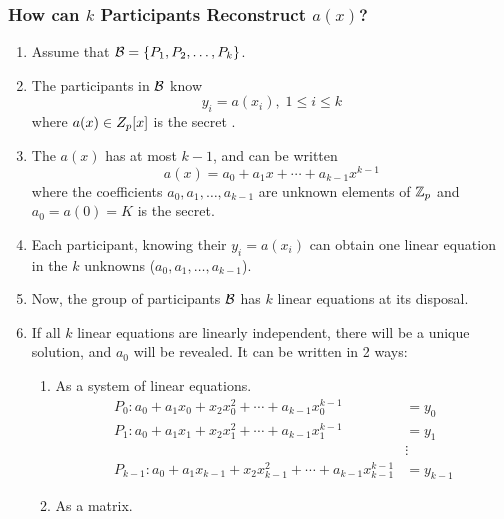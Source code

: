\subsubsection{\texorpdfstring{How can $k$ Participants Reconstruct $a(x)$?}{Successfully Reconstruct the Key}}\label{subsubsec:How_k_Participants_Reconstruct}
\begin{enumerate}[noitemsep]
\item Assume that $\operatorname{\mathcal{B}} = \lbrace P_{1}, P_{2}, \ldots, P_{k} \rbrace$.
\item The participants in $\operatorname{\mathcal{B}}$ know
  \begin{equation*}
    y_{i} = a(x_{i}), \; 1 \leq i \leq k
  \end{equation*}
  where $a(x) \in Z_{p}[x]$ is the secret .
\item The  $a(x)$ has  at most $k-1$, and can be written
  \begin{equation*}
    a(x) = a_{0} + a_{1}x + \cdots + a_{k-1} x^{k-1}
  \end{equation*}
  where the coefficients $a_{0}, a_{1}, \ldots, a_{k-1}$ are unknown elements of $\operatorname{\mathbb{Z}}_{p}$ and $a_{0} = a(0) = K$ is the secret.
\item Each participant, knowing their $y_{i} = a(x_{i})$ can obtain one linear equation in the $k$ unknowns ($a_{0}, a_{1}, \ldots, a_{k-1}$).
\item Now, the group of participants $\operatorname{\mathcal{B}}$ has $k$ linear equations at its disposal.
\item If all $k$ linear equations are linearly independent, there will be a unique solution, and $a_{0}$ will be revealed. It can be written in 2 ways:
  \begin{enumerate}[noitemsep]
  \item As a system of linear equations.
    \begin{align*}
      P_{0} : a_{0} + a_{1}x_{0} + x_{2}x_{0}^{2} + \cdots + a_{k-1}x_{0}^{k-1} &= y_{0} \\
      P_{1} : a_{0} + a_{1}x_{1} + x_{2}x_{1}^{2} + \cdots + a_{k-1}x_{1}^{k-1} &= y_{1} \\
       &\vdots \\
      P_{k-1} : a_{0} + a_{1}x_{k-1} + x_{2}x_{k-1}^{2} + \cdots + a_{k-1}x_{k-1}^{k-1} &= y_{k-1}
    \end{align*}
  \item As a matrix.
    \begin{equation*}

\end{equation*}
\end{enumerate}
\end{enumerate}
